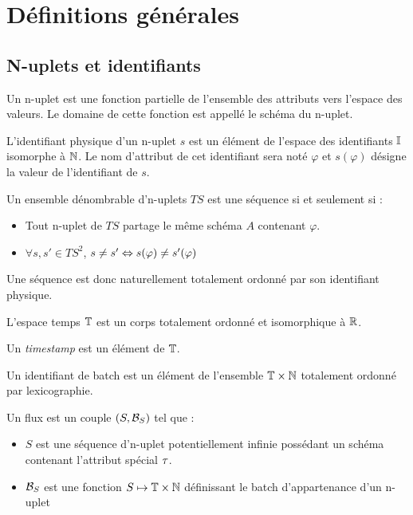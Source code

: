 \section{Définitions générales}
\subsection{N-uplets et identifiants}
\begin{defi}[n-uplet]
    Un n-uplet est une fonction partielle de l'ensemble des attributs vers l'espace des valeurs. Le domaine de cette fonction est appellé le schéma du n-uplet.
\end{defi}

\begin{defi}
    L'identifiant physique d'un n-uplet $s$ est un élément de l'espace des identifiants $\mathbb{I}$ isomorphe à $\mathbb{N}$. Le nom d'attribut de cet identifiant sera noté $\varphi$ et $s(\varphi)$ désigne la valeur de l'identifiant de $s$.
\end{defi}

\begin{defi}
    Un ensemble dénombrable d'n-uplets $TS$ est une séquence si et seulement si : 
    \begin{itemize}
     \item Tout n-uplet de $TS$ partage le même schéma $A$ contenant $\varphi$.
     \item $\forall s,s' \in TS^2$, $s\neq s' \Leftrightarrow s(\varphi) \neq s'(\varphi)$
    \end{itemize}

    Une séquence est donc naturellement totalement ordonné par son identifiant physique.
\end{defi}


\begin{defi}[Timestamp]
    L'espace temps $\mathbb{T}$ est un corps totalement ordonné et isomorphique à $\mathbb{R}$. 

    Un \textit{timestamp} est un élément de $\mathbb{T}$.
\end{defi}


\begin{defi}
    Un identifiant de batch est un élément de l'ensemble $\mathbb{T}\times\mathbb{N}$ totalement ordonné par lexicographie.
\end{defi}

\begin{defi}[Flux]
    Un flux est un couple $(S,\mathcal{B}_S)$ tel que :
    \begin{itemize}
        \item $S$ est une séquence d'n-uplet potentiellement infinie possédant un schéma contenant l'attribut spécial $\tau$.
        \item $\mathcal{B}_S$ est une fonction $S\mapsto \mathbb{T}\times\mathbb{N}$ définissant le batch d'appartenance d'un n-uplet
    \end{itemize}
\end{defi}

